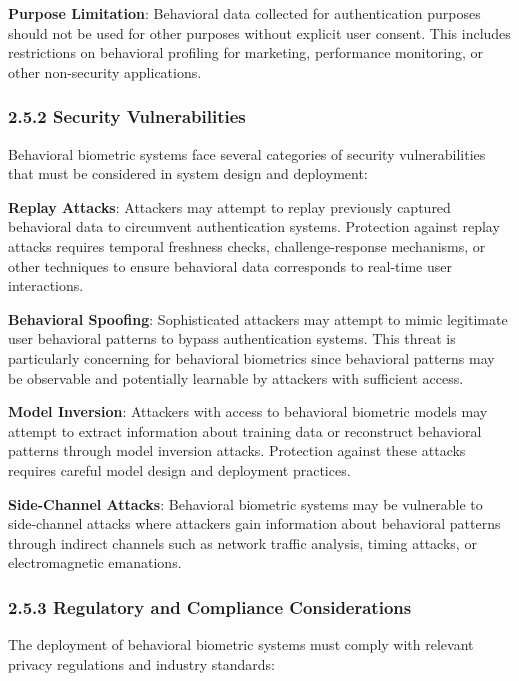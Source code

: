 \documentclass[
  11pt,
  a4paper,
]{article}
\begin{document}
\textbf{Purpose Limitation}: Behavioral data collected for
authentication purposes should not be used for other purposes without
explicit user consent. This includes restrictions on behavioral
profiling for marketing, performance monitoring, or other non-security
applications.

\subsubsection{2.5.2 Security
Vulnerabilities}\label{security-vulnerabilities}

Behavioral biometric systems face several categories of security
vulnerabilities that must be considered in system design and deployment:

\textbf{Replay Attacks}: Attackers may attempt to replay previously
captured behavioral data to circumvent authentication systems.
Protection against replay attacks requires temporal freshness checks,
challenge-response mechanisms, or other techniques to ensure behavioral
data corresponds to real-time user interactions.

\textbf{Behavioral Spoofing}: Sophisticated attackers may attempt to
mimic legitimate user behavioral patterns to bypass authentication
systems. This threat is particularly concerning for behavioral
biometrics since behavioral patterns may be observable and potentially
learnable by attackers with sufficient access.

\textbf{Model Inversion}: Attackers with access to behavioral biometric
models may attempt to extract information about training data or
reconstruct behavioral patterns through model inversion attacks.
Protection against these attacks requires careful model design and
deployment practices.

\textbf{Side-Channel Attacks}: Behavioral biometric systems may be
vulnerable to side-channel attacks where attackers gain information
about behavioral patterns through indirect channels such as network
traffic analysis, timing attacks, or electromagnetic emanations.

\subsubsection{2.5.3 Regulatory and Compliance
Considerations}\label{regulatory-and-compliance-considerations}

The deployment of behavioral biometric systems must comply with relevant
privacy regulations and industry standards:
\end{document}
